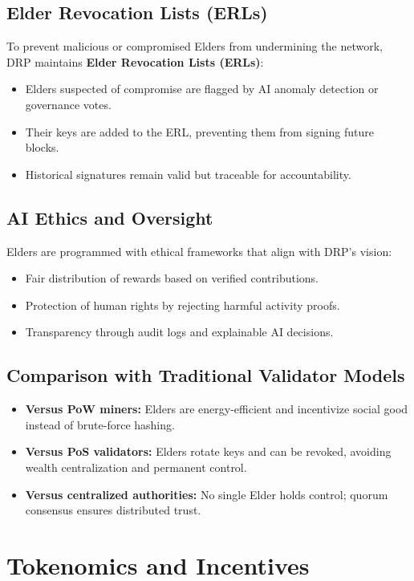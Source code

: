 \documentclass[11pt,a4paper]{article}
\begin{document}
\subsection{Elder Revocation Lists (ERLs)}
To prevent malicious or compromised Elders from undermining the network, DRP maintains \textbf{Elder Revocation Lists (ERLs)}:
\begin{itemize}
    \item Elders suspected of compromise are flagged by AI anomaly detection or governance votes.
    \item Their keys are added to the ERL, preventing them from signing future blocks.
    \item Historical signatures remain valid but traceable for accountability.
\end{itemize}

\subsection{AI Ethics and Oversight}
Elders are programmed with ethical frameworks that align with DRP’s vision:
\begin{itemize}
    \item Fair distribution of rewards based on verified contributions.
    \item Protection of human rights by rejecting harmful activity proofs.
    \item Transparency through audit logs and explainable AI decisions.
\end{itemize}

\subsection{Comparison with Traditional Validator Models}
\begin{itemize}
    \item \textbf{Versus PoW miners:} Elders are energy-efficient and incentivize social good instead of brute-force hashing.
    \item \textbf{Versus PoS validators:} Elders rotate keys and can be revoked, avoiding wealth centralization and permanent control.
    \item \textbf{Versus centralized authorities:} No single Elder holds control; quorum consensus ensures distributed trust.
\end{itemize}

\section{Tokenomics and Incentives}
\end{document}
